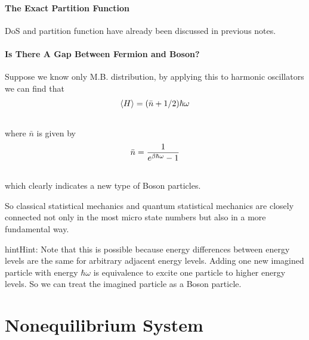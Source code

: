 \documentclass[letterpaper,10pt,english]{sphinxmanual}
\newcommand{\avg}[1]{\left< #1 \right>}
\begin{document}
\subsubsection{The Exact Partition Function}
\label{equilibrium/week6:the-exact-partition-function}
DoS and partition function have already been discussed in previous notes.


\subsubsection{Is There A Gap Between Fermion and Boson?}
\label{equilibrium/week6:is-there-a-gap-between-fermion-and-boson}
Suppose we know only M.B. distribution, by applying this to harmonic oscillators we can find that
\begin{gather}
\begin{split}\avg{H} = (\bar n + 1/2)\hbar \omega\end{split}\notag\\\begin{split}\end{split}\notag
\end{gather}
where $\bar n$ is given by
\begin{gather}
\begin{split}\bar n = \frac{1}{e^{\beta \hbar \omega} - 1}\end{split}\notag\\\begin{split}\end{split}\notag
\end{gather}
which clearly indicates a new type of Boson particles.

So classical statistical mechanics and quantum statistical mechanics are closely connected not only in the most micro state numbers but also in a more fundamental way.

\begin{notice}{hint}{Hint:}
Note that this is possible because energy differences between energy levels are the same for arbitrary adjacent energy levels. Adding one new imagined particle with energy $\hbar\omega$ is equivalence to excite one particle to higher energy levels. So we can treat the imagined particle as a Boson particle.
\end{notice}


\chapter{Nonequilibrium System}
\label{index:nonequilibrium-system}
\end{document}
